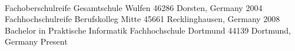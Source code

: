 \documentclass[]{awesome-cv}
\begin{document}
\begin{center}
	  \\
	\vspace{5mm}
\end{center}

\vspace{+10mm}
\begin{cventries}
	\cventry
	{Fachoberschulreife}
	{Gesamtschule Wulfen}
	{46286 Dorsten, Germany}
	{2004}
	{}
	\cventry
	{Fachhochschulreife}
	{Berufskolleg Mitte}
	{45661 Recklinghausen, Germany}
	{2008}
	{}
	\cventry
	{Bachelor in Praktische Informatik}
	{Fachhochschule Dortmund}
	{44139 Dortmund, Germany}
	{Present}
	{}
\end{cventries}
\end{document}
